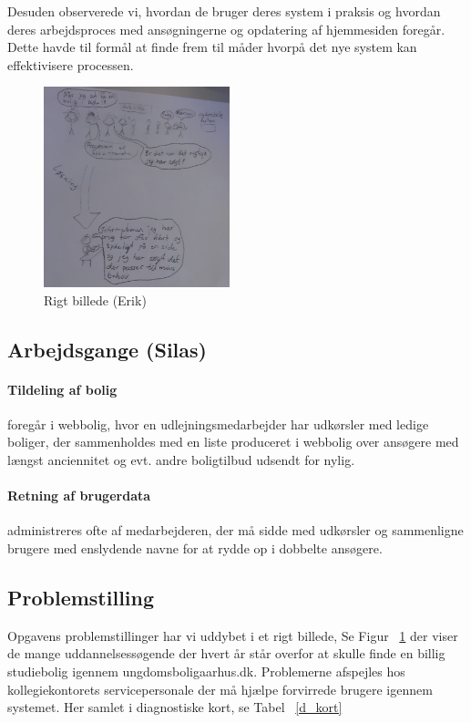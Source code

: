 \documentclass[12pt, a4paper]{report}
\begin{document}
Desuden observerede vi, hvordan de bruger deres system i praksis og hvordan deres arbejdsproces med ansøgningerne og opdatering af hjemmesiden foregår. Dette havde til formål at finde frem til måder hvorpå det nye system kan effektivisere processen.

\begin{figure}
\includegraphics[width=0.48\textwidth]{rigtbillede}
\caption{Rigt billede (Erik)}
\label{r_billede}
\end{figure}
\paragraph{}
\vspace*{-1\parskip}

\subsection{Arbejdsgange (Silas)}
\paragraph{Tildeling af bolig} foregår i webbolig, hvor en udlejningsmedarbejder har udkørsler med ledige boliger, der sammenholdes med en liste produceret i webbolig over ansøgere med længst anciennitet og evt. andre boligtilbud udsendt for nylig.

\paragraph{Retning af brugerdata} administreres ofte af medarbejderen, der må sidde med udkørsler og sammenligne brugere med enslydende navne for at rydde op i dobbelte ansøgere.

\subsection{Problemstilling}
Opgavens problemstillinger har vi uddybet i et rigt billede, Se Figur ~\ref{r_billede} der viser de mange uddannelsessøgende der hvert år står overfor at skulle finde en billig studiebolig igennem ungdomsboligaarhus.dk. Problemerne afspejles hos kollegiekontorets servicepersonale der må hjælpe forvirrede brugere igennem systemet. Her samlet i diagnostiske kort, se Tabel ~\ref{d_kort}
\end{document}
